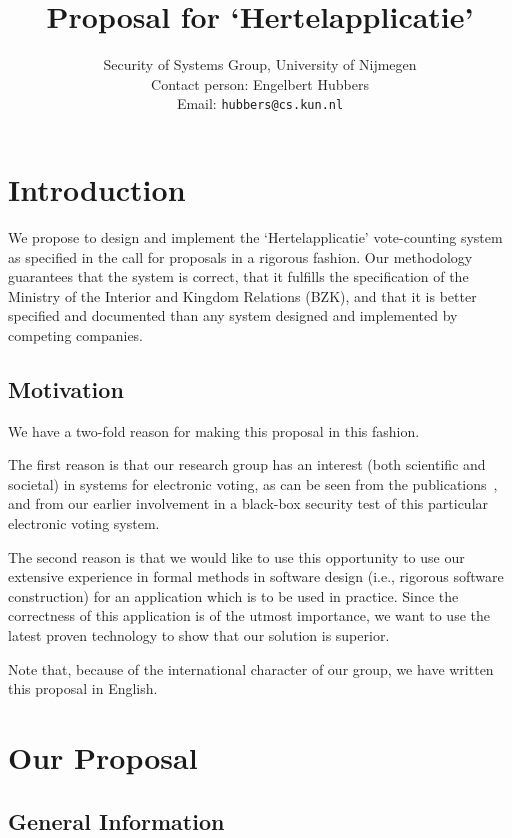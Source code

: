 \documentclass{article}
\title{Proposal for `Hertelapplicatie'}
\author{Security of Systems Group, University of Nijmegen \\
Contact person: Engelbert Hubbers \\
Email: {\tt hubbers@cs.kun.nl}}
\begin{document}
\maketitle

\section{Introduction}
We propose to design and implement the `Hertelapplicatie'
vote-counting system as specified in the call for proposals \cite{CFPBZK}
in a rigorous fashion.  Our
methodology guarantees that the system is correct, that it fulfills
the specification of the Ministry of the Interior and Kingdom Relations (BZK), and that it is better specified and
documented than any system designed and implemented by competing
companies.

\subsection*{Motivation}
We have a two-fold reason for making this proposal in this fashion.

The first reason is that our research group has an interest (both
scientific and societal) in systems for electronic voting, as can be
seen from the
publications~\cite{Breunesse_Jacobs_Oostdijk:02voting,Jacobs:03inaug},
and from our earlier involvement in a black-box security test of this
particular electronic voting system.

The second reason is that we would like to use this opportunity to use
our extensive experience in formal methods in software design (i.e.,
rigorous software construction) for an application which is to be
used in practice.  Since the correctness of this application is of the
utmost importance, we want to use the latest proven technology to show
that our solution is superior.

\vspace{0.5cm}
\noindent Note that, because of the international character of our group, we
have written this proposal in English.

\section{Our Proposal}

\subsection{General Information}
\end{document}
